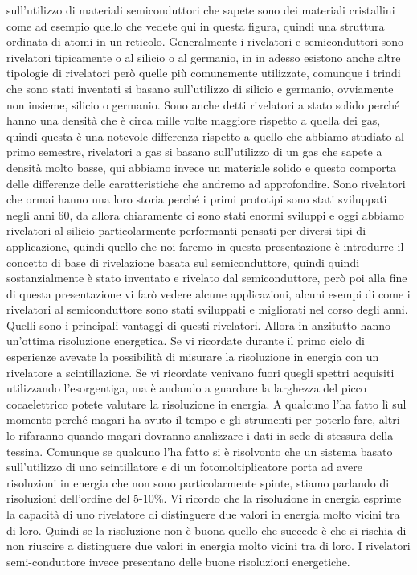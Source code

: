 sull'utilizzo di materiali semiconduttori che sapete sono dei materiali cristallini come ad esempio quello che vedete qui in questa figura, quindi una struttura ordinata di atomi in un reticolo. Generalmente i rivelatori e semiconduttori sono rivelatori tipicamente o al silicio o al germanio, in in adesso esistono anche altre tipologie di rivelatori però quelle più comunemente utilizzate, comunque i trindi che sono stati inventati si basano sull'utilizzo di silicio e germanio, ovviamente non insieme, silicio o germanio. Sono anche detti rivelatori a stato solido perché hanno una densità che è circa mille volte maggiore rispetto a quella dei gas, quindi questa è una notevole differenza rispetto a quello che abbiamo studiato al primo semestre, rivelatori a gas si basano sull'utilizzo di un gas che sapete a densità molto basse, qui abbiamo invece un materiale solido e questo comporta delle differenze delle caratteristiche che andremo ad approfondire. Sono rivelatori che ormai hanno una loro storia perché i primi prototipi sono stati sviluppati negli anni 60, da allora chiaramente ci sono stati enormi sviluppi e oggi abbiamo rivelatori al silicio particolarmente performanti pensati per diversi tipi di applicazione, quindi quello che noi faremo in questa presentazione è introdurre il concetto di base di rivelazione basata sul semiconduttore, quindi quindi sostanzialmente è stato inventato e rivelato dal semiconduttore, però poi alla fine di questa presentazione vi farò vedere alcune applicazioni, alcuni esempi di come i rivelatori al semiconduttore sono stati sviluppati e migliorati nel corso degli anni. Quelli sono i principali vantaggi di questi rivelatori. Allora in anzitutto hanno un'ottima risoluzione energetica. Se vi ricordate durante il primo ciclo di esperienze avevate la possibilità di misurare la risoluzione in energia con un rivelatore a scintillazione. Se vi ricordate venivano fuori quegli spettri acquisiti utilizzando l'esorgentiga, ma è andando a guardare la larghezza del picco cocaelettrico potete valutare la risoluzione in energia. A qualcuno l'ha fatto lì sul momento perché magari ha avuto il tempo e gli strumenti per poterlo fare, altri lo rifaranno quando magari dovranno analizzare i dati in sede di stessura della tessina. Comunque se qualcuno l'ha fatto si è risolvonto che un sistema basato sull'utilizzo di uno scintillatore e di un fotomoltiplicatore porta ad avere risoluzioni in energia che non sono particolarmente spinte, stiamo parlando di risoluzioni dell'ordine del 5-10\%. Vi ricordo che la risoluzione in energia esprime la capacità di uno rivelatore di distinguere due valori in energia molto vicini tra di loro. Quindi se la risoluzione non è buona quello che succede è che si rischia di non riuscire a distinguere due valori in energia molto vicini tra di loro. I rivelatori semi-conduttore invece presentano delle buone risoluzioni energetiche.

